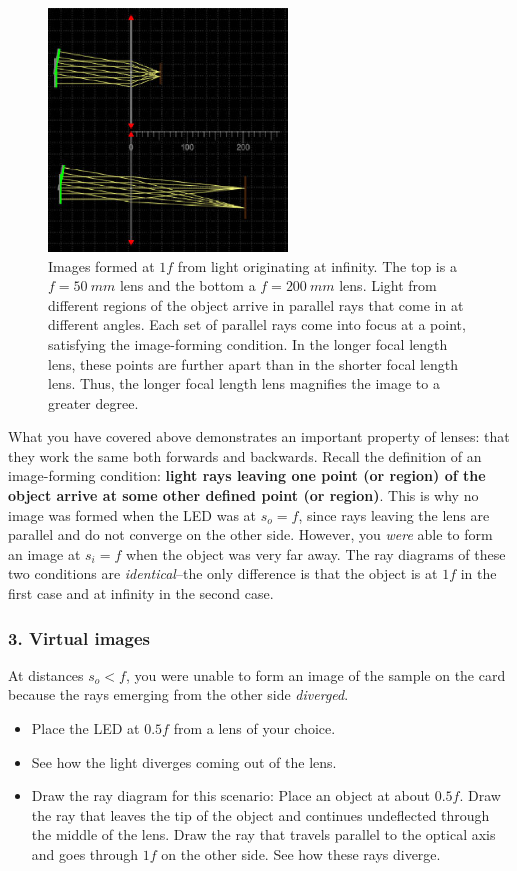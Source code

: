 \documentclass[a4paper]{report}
\begin{document}
\begin{figure}[h]
\center
\includegraphics[width=2.5in]{image_forming_outside.eps}
\caption{Images formed at $1f$ from light originating at infinity. 
The top is a $f=50~mm$ lens and the bottom a $f=200~mm$ lens.
Light from different regions of the object arrive in parallel rays that come in at different angles. 
Each set of parallel rays come into focus at a point, satisfying the image-forming condition. 
In the longer focal length lens, these points are further apart than in the shorter focal length lens. 
Thus, the longer focal length lens magnifies the image to a greater degree. 
 }
\label{fig:outside}
\end{figure}


What you have covered above demonstrates an important property of lenses: that they work the same both forwards and backwards.
Recall the definition of an image-forming condition: \textbf{light rays leaving one point (or region) of the object arrive at some other defined point (or region)}.
This is why no image was formed when the LED was at $s_o=f$, since rays leaving the lens are parallel and do not converge on the other side. 
However, you \textit{were} able to form an image at $s_i=f$ when the object was very far away. 
The ray diagrams of these two conditions are \textit{identical}--the only difference is that the object is at $1f$ in the first case and at infinity in the second case.

\subsubsection{3. Virtual images}
At distances $s_o<f$, you were unable to form an image of the sample on the card because the rays emerging from the other side \textit{diverged}.
\begin{itemize}
\item Place the LED at $0.5f$ from a lens of your choice. 
\item See how the light diverges coming out of the lens. 
\item Draw the ray diagram for this scenario: Place an object at about $0.5f$.
Draw the ray that leaves the tip of the object and continues undeflected through the middle of the lens. 
Draw the ray that travels parallel to the optical axis and goes through $1f$ on the other side.
See how these rays diverge. 
\end{itemize}
\end{document}
